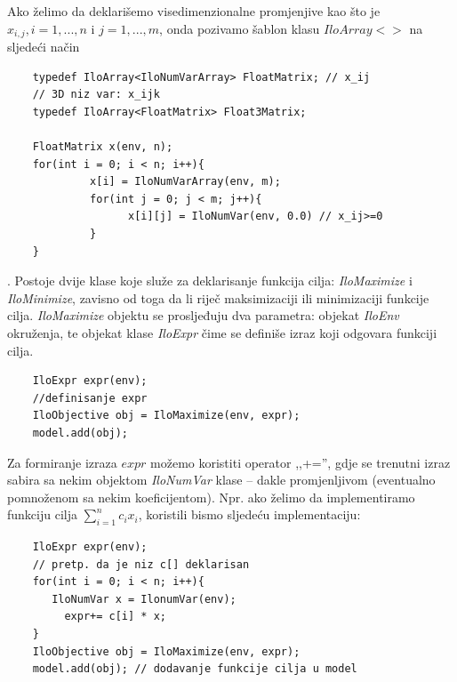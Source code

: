 \documentclass[b5paper, utf8, 11pt, colorlinks]{book}
\theoremstyle{definition}
\begin{document}
 \noindent Ako želimo da deklarišemo visedimenzionalne promjenjive kao što je $x_{i,j}, i=1,...,n$ i $j=1,...,m$, onda pozivamo šablon klasu ${IloArray}<>$ na sljedeći način
 
 \begin{verbatim}
 	typedef IloArray<IloNumVarArray> FloatMatrix; // x_ij 
 	// 3D niz var: x_ijk
 	typedef IloArray<FloatMatrix> Float3Matrix; 
 	
 	FloatMatrix x(env, n);
 	for(int i = 0; i < n; i++){
 		     x[i] = IloNumVarArray(env, m);
 		     for(int j = 0; j < m; j++){
 		  	       x[i][j] = IloNumVar(env, 0.0) // x_ij>=0
 		     }
 	}
 \end{verbatim}
 
 . 
 Postoje dvije klase koje služe za deklarisanje funkcija cilja: \emph{IloMaximize} i \emph{IloMinimize}, zavisno od toga da li riječ maksimizaciji ili minimizaciji funkcije cilja.  \emph{IloMaximize} objektu se prosljeđuju dva parametra: objekat \emph{IloEnv} okruženja, te objekat klase \emph{IloExpr} čime se definiše  izraz koji odgovara funkciji cilja. 
 
 \begin{verbatim}
 	IloExpr expr(env);
 	//definisanje expr
 	IloObjective obj = IloMaximize(env, expr);
 	model.add(obj);
 \end{verbatim}
 
 \noindent Za formiranje izraza $expr$ možemo koristiti operator  ,,+='', gdje se trenutni izraz sabira sa nekim objektom \emph{IloNumVar} klase -- dakle promjenljivom (eventualno pomnoženom sa nekim koeficijentom). 
 Npr. ako želimo da implementiramo funkciju cilja $\sum_{i=1}^n c_i x_i$, koristili bismo sljedeću implementaciju:
 
 \begin{verbatim}
 	IloExpr expr(env);
 	// pretp. da je niz c[] deklarisan
 	for(int i = 0; i < n; i++){
       IloNumVar x = IlonumVar(env);
 	     expr+= c[i] * x;
 	}
 	IloObjective obj = IloMaximize(env, expr);
 	model.add(obj); // dodavanje funkcije cilja u model
 \end{verbatim}
 
\end{document}
